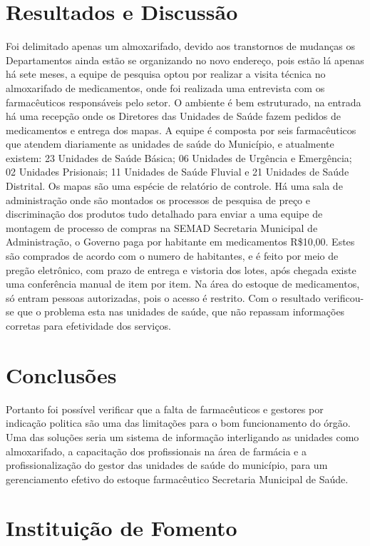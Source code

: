 \documentclass[article,12pt,onesidea,4paper,english,brazil]{abntex2}
\begin{document}
\section*{Resultados e Discussão}

Foi delimitado apenas um almoxarifado, devido aos transtornos de mudanças os Departamentos ainda estão se organizando no novo endereço, pois estão lá apenas há sete meses, a equipe de pesquisa optou por realizar a visita técnica no almoxarifado de medicamentos, onde foi realizada uma entrevista com os farmacêuticos responsáveis pelo setor. O ambiente é bem estruturado, na entrada há uma recepção onde os Diretores das Unidades de Saúde fazem pedidos de medicamentos e entrega dos mapas. A equipe é composta por seis farmacêuticos que atendem diariamente as unidades de saúde do Município, e atualmente existem:
23 Unidades de Saúde Básica; 06 Unidades de Urgência e Emergência; 02 Unidades Prisionais; 11 Unidades de Saúde Fluvial e 21 Unidades de Saúde Distrital.
Os mapas são uma espécie de relatório de controle. Há uma sala de administração onde são montados os processos de pesquisa de preço e discriminação dos produtos tudo detalhado para enviar a uma equipe de montagem de processo de compras na SEMAD Secretaria Municipal de Administração, o Governo paga por habitante em medicamentos R\$10,00. Estes são comprados de acordo com o numero de habitantes, e é feito por meio de pregão eletrônico, com prazo de entrega e vistoria dos lotes, após chegada existe uma conferência manual de item por item. Na área do estoque de medicamentos, só entram pessoas autorizadas, pois o acesso é restrito. Com o resultado verificou-se que o problema esta nas unidades de saúde, que não repassam informações corretas para efetividade dos serviços.


\section*{Conclusões}

Portanto foi possível verificar que a falta de farmacêuticos e gestores por indicação politica são uma das limitações para o bom funcionamento do órgão. Uma das soluções seria um sistema de informação interligando as unidades como almoxarifado, a capacitação dos profissionais na área de farmácia e a profissionalização do gestor das unidades de saúde do município, para um gerenciamento efetivo do estoque farmacêutico Secretaria Municipal de Saúde.


\section*{Instituição de Fomento}
\end{document}
